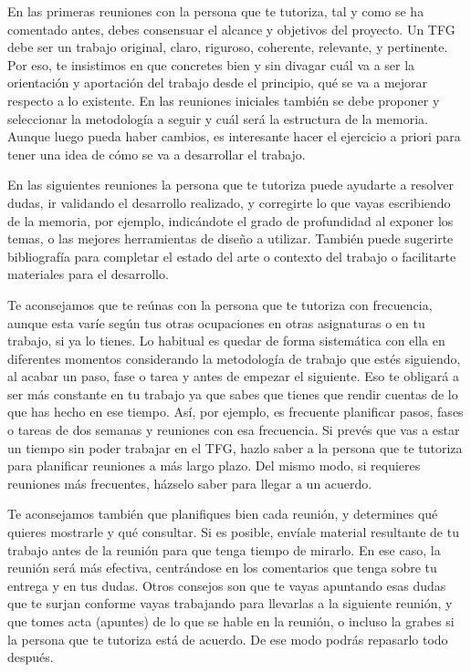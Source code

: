 En las primeras reuniones con la persona que te tutoriza, tal y como se ha comentado antes, debes consensuar el alcance y objetivos del proyecto. Un TFG debe ser un trabajo original, claro, riguroso, coherente, relevante, y pertinente. Por eso, te insistimos en que concretes bien y sin divagar cuál va a ser la orientación y aportación del trabajo desde el principio, qué se va a mejorar respecto a lo existente. En las reuniones iniciales también se debe proponer y seleccionar la metodología a seguir y cuál será la estructura de la memoria. Aunque luego pueda haber cambios, es interesante hacer el ejercicio a priori para tener una idea de cómo se va a desarrollar el trabajo.

En las siguientes reuniones la persona que te tutoriza puede ayudarte a resolver dudas, ir validando el desarrollo realizado, y corregirte lo que vayas escribiendo de la memoria, por ejemplo, indicándote el grado de profundidad al exponer los temas, o las mejores herramientas de diseño a utilizar. También puede sugerirte bibliografía para completar el estado del arte o contexto del trabajo o facilitarte materiales para el desarrollo. 

Te aconsejamos que te reúnas con la persona que te tutoriza con frecuencia, aunque esta varíe según tus otras ocupaciones en otras asignaturas o en tu trabajo, si ya lo tienes. Lo habitual es quedar de forma sistemática con ella en diferentes momentos considerando la metodología de trabajo que estés siguiendo, al acabar un paso, fase o tarea y antes de empezar el siguiente. Eso te obligará a ser más constante en tu trabajo ya que sabes que tienes que rendir cuentas de lo que has hecho en ese tiempo. Así, por ejemplo, es frecuente planificar pasos, fases o tareas de dos semanas y reuniones con esa frecuencia. Si prevés que vas a estar un tiempo sin poder trabajar en el TFG, hazlo saber a la persona que te tutoriza para planificar reuniones a más largo plazo. Del mismo modo, si requieres reuniones más frecuentes, házselo saber para llegar a un acuerdo. 

Te aconsejamos también que planifiques bien cada reunión, y determines qué quieres mostrarle y qué consultar. Si es posible, envíale material resultante de tu trabajo antes de la reunión para que tenga tiempo de mirarlo. En ese caso, la reunión será más efectiva, centrándose en los comentarios que tenga sobre tu entrega y en tus dudas. Otros consejos son que te vayas apuntando esas dudas que te surjan conforme vayas trabajando para llevarlas a la siguiente reunión, y que tomes acta (apuntes) de lo que se hable en la reunión, o incluso la grabes si la persona que te tutoriza está de acuerdo. De ese modo podrás repasarlo todo después. 

